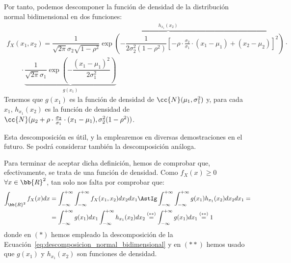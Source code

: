 Por tanto, podemos descomponer la función de densidad de la distribución normal bidimensional en dos funciones:
\begin{multline}\label{eq:descomposicion_normal_bidimensional}
    f_X(x_1,x_2)
    =\overbrace{\dfrac{1}{\sqrt{2\pi}\sigma_2\sqrt{1-\rho^2}}\exp\left(-\dfrac{1}{2\sigma_2^2(1-\rho^2)}\left[-\rho\cdot \frac{\sigma_2}{\sigma_1}\cdot (x_1-\mu_1)+ (x_2-\mu_2)\right]^2\right)}^{h_{x_1}(x_2)}
    \cdot\\\qquad \cdot \underbrace{\dfrac{1}{\sqrt{2\pi}\sigma_1}\exp\left(-\dfrac{(x_1-\mu_1)^2}{2\sigma_1^2}\right)}_{g(x_1)}
\end{multline}
Tenemos que $g(x_1)$ es la función de densidad de $\cc{N}(\mu_1, \sigma_1^2)$ y, para cada $x_1$, $h_{x_1}(x_2)$ es la función de densidad de $\cc{N}(\mu_2+\rho\cdot \frac{\sigma_2}{\sigma_1}\cdot (x_1-\mu_1), \sigma_2^2(1-\rho^2))$.\\
\begin{comment}
Repitiendo el proceso con el término $\left(\frac{x_2-\mu_2}{\sigma_2}\right)^2$, obtenemos que:
\begin{align*}
    f_X(x_1,x_2)
    &=\overbrace{\dfrac{1}{\sqrt{2\pi}\sigma_2}\exp\left(-\dfrac{(x_2-\mu_2)^2}{2\sigma_2^2}\right)}^{p(x_2)}\cdot
    \cdot\\&\qquad \cdot\underbrace{\dfrac{1}{\sqrt{2\pi}\sigma_1\sqrt{1-\rho^2}}\exp\left(-\dfrac{1}{2\sigma_1^2(1-\rho^2)}\left[-\rho\cdot \frac{\sigma_1}{\sigma_2}\cdot (x_2-\mu_2)+ (x_1-\mu_1)\right]^2\right)}_{q_{x_2}(x_1)}
\end{align*}
En este caso, $p(x_2)$ es la función de densidad de $\cc{N}(\mu_2, \sigma_2^2)$ y, para cada $x_2$, $q_{x_2}(x_1)$ es la función de densidad de $\cc{N}(\mu_1+\rho\cdot \frac{\sigma_1}{\sigma_2}\cdot (x_2-\mu_2), \sigma_1^2(1-\rho^2))$.
\end{comment}
Esta descomposición es útil, y la emplearemos en diversas demostraciones en el futuro. Se podrá considerar también la descomposición análoga.


Para terminar de aceptar dicha definición, hemos de comprobar que, efectivamente, se trata de una función de densidad.
Como $f_X(x)\geq 0$ $\forall x\in \bb{R}^2$, tan solo nos falta por comprobar que:
\begin{align*}
    \int_{\bb{R}^2} f_X(x)dx
    &= \int_{-\infty}^{+\infty}\int_{-\infty}^{+\infty} f_X(x_1,x_2)dx_2dx_1
    \AstIg
    \int_{-\infty}^{+\infty}\int_{-\infty}^{+\infty} g(x_1)h_{x_1}(x_2)dx_2dx_1
    =\\&=
    \int_{-\infty}^{+\infty} g(x_1)dx_1\int_{-\infty}^{+\infty} h_{x_1}(x_2)dx_2
    \stackrel{(\ast\ast)}{=}
    \int_{-\infty}^{+\infty} g(x_1)dx_1
    \stackrel{(\ast\ast)}{=} 1
\end{align*}
donde en $(\ast)$ hemos empleado la descomposición de la Ecuación~\ref{eq:descomposicion_normal_bidimensional} y en $(\ast\ast)$ hemos usado que $g(x_1)$ y $h_{x_1}(x_2)$ son funciones de densidad.


